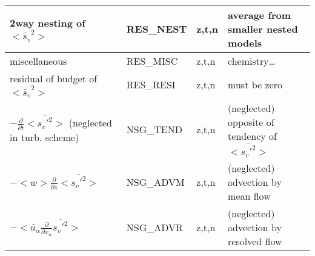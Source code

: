 \begin{longtable}[c]{|p{}|p{}|p{}|p{}|}
{\rm 2way nesting of }$<\tilde{s_v}^2>$                            & RES\_NEST  & z,t,n & average from smaller nested models \\\hline
{\rm miscellaneous}                                                & RES\_MISC  & z,t,n & chemistry\ldots \\\hline
{\rm residual of budget of} $<\tilde{s_v}^2>$                      & RES\_RESI  & z,t,n & must be zero \\\hline
$-\frac{\partial }{\partial t}<\overline{s_v'^2}>$ (neglected in turb. scheme) & NSG\_TEND & z,t,n & (neglected) opposite of tendency of $<\overline{s_v'^2}>$ \\\hline
$-<w>\frac{\partial}{\partial z}<\overline{s_v'^2}>$               & NSG\_ADVM  & z,t,n & (neglected) advection by mean flow\\\hline
$-<\tilde{u_\alpha}\frac{\partial}{\partial x_\alpha}\overline{s_v'^2}>$  & NSG\_ADVR & z,t,n & (neglected) advection by resolved flow\\\hline
\end{longtable}
\endgroup
